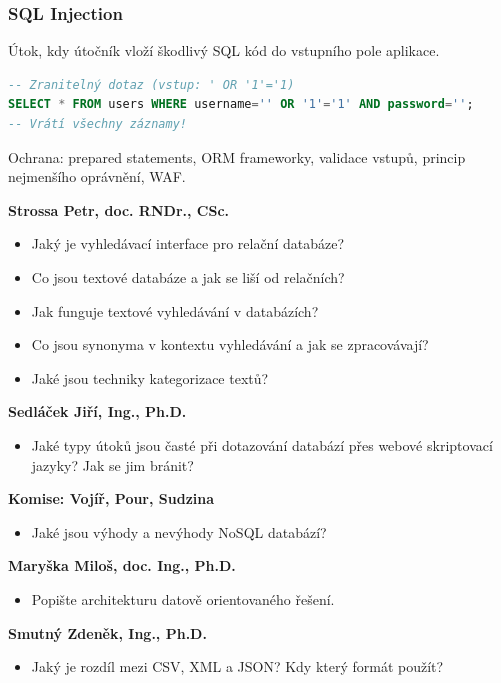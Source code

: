 \subsubsection{SQL Injection}

Útok, kdy útočník vloží škodlivý SQL kód do vstupního pole aplikace.

\begin{lstlisting}[language=SQL, caption=Příklad SQL injection]
-- Zranitelný dotaz (vstup: ' OR '1'='1)
SELECT * FROM users WHERE username='' OR '1'='1' AND password='';
-- Vrátí všechny záznamy!
\end{lstlisting}

Ochrana: prepared statements, ORM frameworky, validace vstupů, princip nejmenšího oprávnění, WAF.

\begin{profesorbox}
\textbf{Strossa Petr, doc. RNDr., CSc.}
\begin{itemize}
  \item Jaký je vyhledávací interface pro relační databáze?
  \item Co jsou textové databáze a jak se liší od relačních?
  \item Jak funguje textové vyhledávání v databázích?
  \item Co jsou synonyma v kontextu vyhledávání a jak se zpracovávají?
  \item Jaké jsou techniky kategorizace textů?
\end{itemize}
\textbf{Sedláček Jiří, Ing., Ph.D.}
\begin{itemize}
  \item Jaké typy útoků jsou časté při dotazování databází přes webové skriptovací jazyky? Jak se jim bránit?
\end{itemize}
\textbf{Komise: Vojíř, Pour, Sudzina}
\begin{itemize}
  \item Jaké jsou výhody a nevýhody NoSQL databází?
\end{itemize}
\textbf{Maryška Miloš, doc. Ing., Ph.D.}
\begin{itemize}
  \item Popište architekturu datově orientovaného řešení.
\end{itemize}
\textbf{Smutný Zdeněk, Ing., Ph.D.}
\begin{itemize}
  \item Jaký je rozdíl mezi CSV, XML a JSON? Kdy který formát použít?
\end{itemize}
\end{profesorbox}
